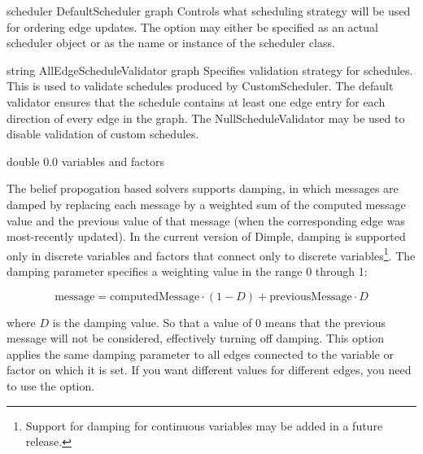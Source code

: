 
{scheduler}
{DefaultScheduler}
{graph}
{Controls what scheduling strategy will be used for ordering edge updates. The option may either be specified as an actual scheduler object or as the name or instance of the scheduler class.}


{string}
{AllEdgeScheduleValidator}
{graph}
{Specifies validation strategy for schedules. This is used to validate schedules produced by CustomScheduler. The default validator ensures that the schedule contains at least one edge entry for each direction of every edge in the graph. The NullScheduleValidator may be used to disable validation of custom schedules.}


{double}
{0.0}
{variables and factors}
{The belief propogation based solvers supports damping, in which messages are damped by replacing each message by a weighted sum of the computed message value and the previous value of that message (when the corresponding edge was most-recently updated). In the current version of Dimple, damping is supported only in discrete variables and factors that connect only to discrete variables\footnote{Support for damping for continuous variables may be added in a future release.}.
\linebreak
\linebreak
The damping parameter specifies a weighting value in the range 0 through 1:

\[
\mathrm{message} = \mathrm{computedMessage} \cdot (1 - D) + \mathrm{previousMessage} \cdot D
\]

where $D$ is the damping value. So that a value of 0 means that the previous message will not be considered, effectively turning off damping.
\linebreak
\linebreak
This option applies the same damping parameter to all edges connected to the variable or factor on which it is set. If you want different values for different edges, you need to use the  option.
}


